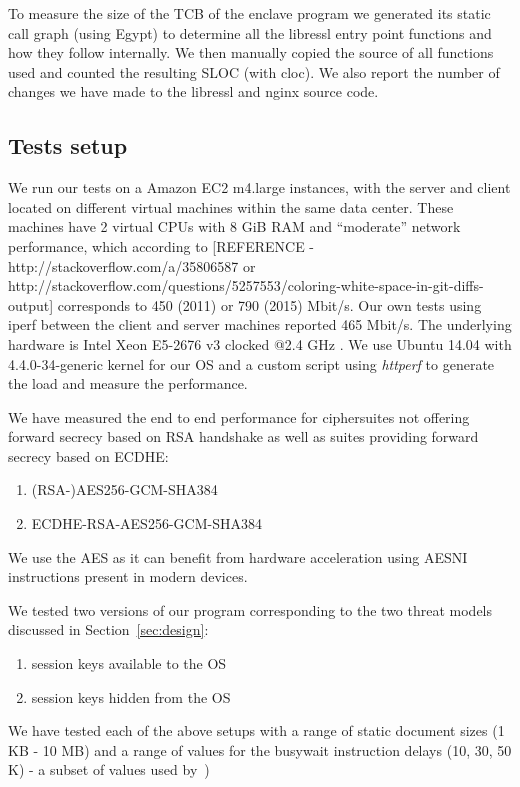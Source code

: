 \documentclass[../main.tex]{subfiles}
\begin{document}
To measure the size of the TCB of the enclave program we generated its
static call graph (using Egypt) to determine all the libressl entry
point functions and how they follow internally. We then manually
copied the source of all functions used and counted the resulting SLOC
(with cloc). We also report the number of changes we have made to the
libressl and nginx source code.

\subsection{Tests setup}
We run our tests on a Amazon EC2 m4.large instances, with the server
and client located on different virtual machines within the same data
center. These machines have 2 virtual CPUs with 8 GiB RAM and
``moderate'' network performance, which according to [REFERENCE -
http://stackoverflow.com/a/35806587 or
http://stackoverflow.com/questions/5257553/coloring-white-space-in-git-diffs-output]
corresponds to 450 (2011) or 790 (2015) Mbit/s. Our own tests using
iperf between the client and server machines reported 465 Mbit/s. The
underlying hardware is Intel Xeon E5-2676 v3 clocked @2.4 GHz
\cite{aws_instances}. We use Ubuntu 14.04 with 4.4.0-34-generic kernel
for our OS and a custom script using \textit{httperf} to generate the
load and measure the performance.

We have measured the end to end performance for ciphersuites not
offering forward secrecy based on RSA handshake as well as suites
providing forward secrecy based on ECDHE:
\begin{enumerate}
  \item (RSA-)AES256-GCM-SHA384
  \item ECDHE-RSA-AES256-GCM-SHA384
\end{enumerate}

We use the AES as it can benefit from hardware acceleration using
AESNI instructions present in modern devices.

We tested two versions of our program corresponding to the two threat
models discussed in Section~\ref{sec:design}:
\begin{enumerate}
  \item session keys available to the OS
  \item session keys hidden from the OS
\end{enumerate}

We have tested each of the above setups with a range of static
document sizes (1 KB - 10 MB) and a range of values for the busywait
instruction delays (10, 30, 50 K) - a subset of values used
by~\cite{Baumann14})
\end{document}
